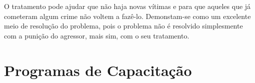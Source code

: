 %
%
%
%
%
%
%
%
%


O tratamento pode ajudar que não haja novas vítimas e para que aqueles que já cometeram algum crime não voltem a fazê-lo. Demonstam-se como um excelente meio de resolução do problema, pois o problema não é resolvido simplesmente com a punição do agressor, mais sim, com o seu tratamento. 

\section{Programas de Capacitação}\label{sec:programas}

